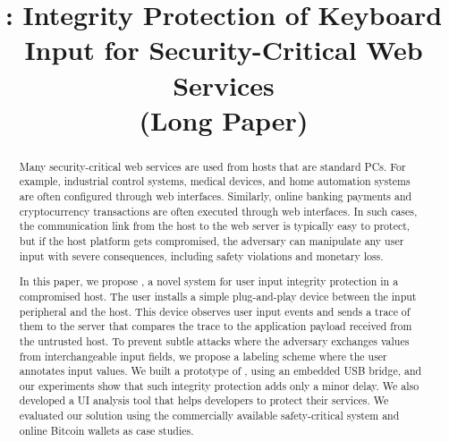 


\newif\ifpaper
\papertrue

\newif\ifbold
\boldtrue

\newif\ifdesperatetime

\graphicspath{{images/}}


\title{\name: Integrity Protection of Keyboard Input for Security-Critical Web Services \\ (Long Paper)}


\maketitle
{}
\begin{abstract}
Many security-critical web services are used from hosts that are standard PCs. For example, industrial control systems, medical devices, and home automation systems are often configured through web interfaces. Similarly, online banking payments and cryptocurrency transactions are often executed through web interfaces. In such cases, the communication link from the host to the web server is typically easy to protect, but if the host platform gets compromised, the adversary can manipulate any user input with severe consequences, including safety violations and monetary loss.

In this paper, we propose \name, a novel system for user input integrity protection in a compromised host. The user installs a simple plug-and-play device between the input peripheral and the host. This device observes user input events and sends a trace of them to the server that compares the trace to the application payload received from the untrusted host. To prevent subtle attacks where the adversary exchanges values from interchangeable input fields, we propose a labeling scheme where the user annotates input values.  We built a prototype of \name, using an embedded USB bridge, and our experiments show that such integrity protection adds only a minor delay. We also developed a UI analysis tool that helps developers to protect their services. We evaluated our solution using the commercially available safety-critical system and online Bitcoin wallets as case studies.
\end{abstract}


















%


